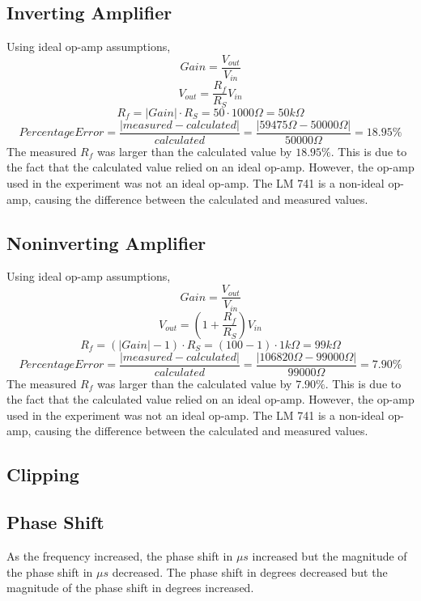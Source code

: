 \documentclass[10pt]{article}
\begin{document}
\subsection*{Inverting Amplifier}
\noindent Using ideal op-amp assumptions,
$$Gain = \frac{V_{out}}{V_{in}}$$
$$V_{out} = \frac{R_f}{R_{S}}V_{in}$$
$$R_f = |Gain| \cdot R_{S} = 50 \cdot 1000\Omega = 50k\Omega$$
$$Percentage Error = \frac{|measured-calculated|}{calculated} = \frac{|59475\Omega-50000\Omega|}{50000\Omega} = 18.95\%$$
\noindent The measured $R_f$ was larger than the calculated value by $18.95\%$. This is due to the fact that the calculated value relied on an ideal op-amp. However, the op-amp used in the experiment was not an ideal op-amp. The LM 741 is a non-ideal op-amp, causing the difference between the calculated and measured values.

\subsection*{Noninverting Amplifier}
\noindent Using ideal op-amp assumptions,
$$Gain = \frac{V_{out}}{V_{in}}$$
$$V_{out} = (1+\frac{R_f}{R_{S}})V_{in}$$
$$R_f = (|Gain|-1)\cdot R_{S} = (100-1)\cdot 1k\Omega = 99k\Omega$$
$$Percentage Error = \frac{|measured-calculated|}{calculated} = \frac{|106820\Omega-99000\Omega|}{99000\Omega} = 7.90\%$$
\noindent The measured $R_f$ was larger than the calculated value by $7.90\%$. This is due to the fact that the calculated value relied on an ideal op-amp. However, the op-amp used in the experiment was not an ideal op-amp. The LM 741 is a non-ideal op-amp, causing the difference between the calculated and measured values.

\subsection*{Clipping}

\subsection*{Phase Shift}
\noindent As the frequency increased, the phase shift in $\mu s$ increased but the magnitude of the phase shift in $\mu s$ decreased. The phase shift in degrees decreased but the magnitude of the phase shift in degrees increased. 
\end{document}
